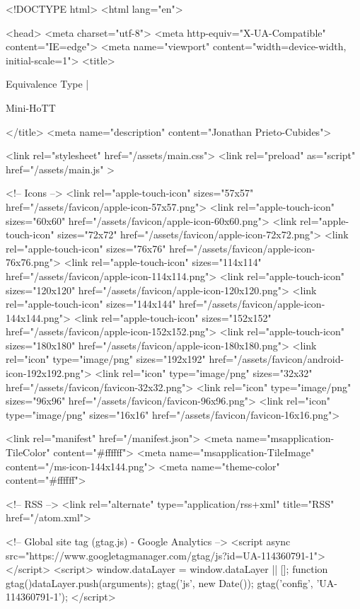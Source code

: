 <!DOCTYPE html>
<html lang="en">

<head>
  <meta charset="utf-8">
  <meta http-equiv="X-UA-Compatible" content="IE=edge">
  <meta name="viewport" content="width=device-width, initial-scale=1">
  <title>
    
      
        Equivalence Type |
      
        Mini-HoTT
    
  </title>
  <meta name="description" content="Jonathan Prieto-Cubides">

  <link rel="stylesheet" href="/assets/main.css">
  <link rel="preload" as="script" href="/assets/main.js" >

  <!-- Icons -->
  <link rel="apple-touch-icon" sizes="57x57" href="/assets/favicon/apple-icon-57x57.png">
  <link rel="apple-touch-icon" sizes="60x60" href="/assets/favicon/apple-icon-60x60.png">
  <link rel="apple-touch-icon" sizes="72x72" href="/assets/favicon/apple-icon-72x72.png">
  <link rel="apple-touch-icon" sizes="76x76" href="/assets/favicon/apple-icon-76x76.png">
  <link rel="apple-touch-icon" sizes="114x114" href="/assets/favicon/apple-icon-114x114.png">
  <link rel="apple-touch-icon" sizes="120x120" href="/assets/favicon/apple-icon-120x120.png">
  <link rel="apple-touch-icon" sizes="144x144" href="/assets/favicon/apple-icon-144x144.png">
  <link rel="apple-touch-icon" sizes="152x152" href="/assets/favicon/apple-icon-152x152.png">
  <link rel="apple-touch-icon" sizes="180x180" href="/assets/favicon/apple-icon-180x180.png">
  <link rel="icon" type="image/png" sizes="192x192"  href="/assets/favicon/android-icon-192x192.png">
  <link rel="icon" type="image/png" sizes="32x32" href="/assets/favicon/favicon-32x32.png">
  <link rel="icon" type="image/png" sizes="96x96" href="/assets/favicon/favicon-96x96.png">
  <link rel="icon" type="image/png" sizes="16x16" href="/assets/favicon/favicon-16x16.png">

  <link rel="manifest" href="/manifest.json">
  <meta name="msapplication-TileColor" content="#ffffff">
  <meta name="msapplication-TileImage" content="/ms-icon-144x144.png">
  <meta name="theme-color" content="#ffffff">

  <!-- RSS -->
  <link rel="alternate" type="application/rss+xml" title="RSS" href="/atom.xml">

  <!-- Global site tag (gtag.js) - Google Analytics -->
  <script async src="https://www.googletagmanager.com/gtag/js?id=UA-114360791-1"></script>
  <script>
    window.dataLayer = window.dataLayer || [];
    function gtag(){dataLayer.push(arguments);}
    gtag('js', new Date());
    gtag('config', 'UA-114360791-1');
  </script>


